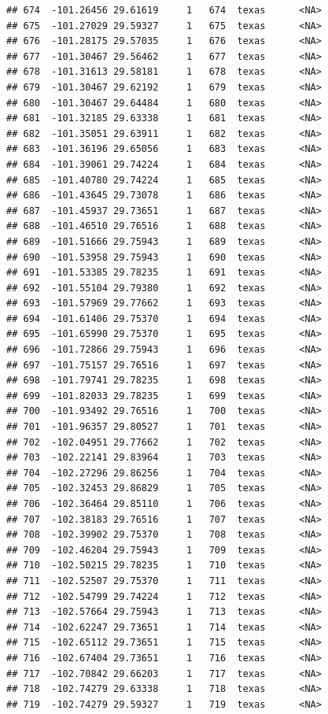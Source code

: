 \documentclass[
]{article}
\begin{document}
\begin{verbatim}
## 674  -101.26456 29.61619     1   674  texas      <NA>
## 675  -101.27029 29.59327     1   675  texas      <NA>
## 676  -101.28175 29.57035     1   676  texas      <NA>
## 677  -101.30467 29.56462     1   677  texas      <NA>
## 678  -101.31613 29.58181     1   678  texas      <NA>
## 679  -101.30467 29.62192     1   679  texas      <NA>
## 680  -101.30467 29.64484     1   680  texas      <NA>
## 681  -101.32185 29.63338     1   681  texas      <NA>
## 682  -101.35051 29.63911     1   682  texas      <NA>
## 683  -101.36196 29.65056     1   683  texas      <NA>
## 684  -101.39061 29.74224     1   684  texas      <NA>
## 685  -101.40780 29.74224     1   685  texas      <NA>
## 686  -101.43645 29.73078     1   686  texas      <NA>
## 687  -101.45937 29.73651     1   687  texas      <NA>
## 688  -101.46510 29.76516     1   688  texas      <NA>
## 689  -101.51666 29.75943     1   689  texas      <NA>
## 690  -101.53958 29.75943     1   690  texas      <NA>
## 691  -101.53385 29.78235     1   691  texas      <NA>
## 692  -101.55104 29.79380     1   692  texas      <NA>
## 693  -101.57969 29.77662     1   693  texas      <NA>
## 694  -101.61406 29.75370     1   694  texas      <NA>
## 695  -101.65990 29.75370     1   695  texas      <NA>
## 696  -101.72866 29.75943     1   696  texas      <NA>
## 697  -101.75157 29.76516     1   697  texas      <NA>
## 698  -101.79741 29.78235     1   698  texas      <NA>
## 699  -101.82033 29.78235     1   699  texas      <NA>
## 700  -101.93492 29.76516     1   700  texas      <NA>
## 701  -101.96357 29.80527     1   701  texas      <NA>
## 702  -102.04951 29.77662     1   702  texas      <NA>
## 703  -102.22141 29.83964     1   703  texas      <NA>
## 704  -102.27296 29.86256     1   704  texas      <NA>
## 705  -102.32453 29.86829     1   705  texas      <NA>
## 706  -102.36464 29.85110     1   706  texas      <NA>
## 707  -102.38183 29.76516     1   707  texas      <NA>
## 708  -102.39902 29.75370     1   708  texas      <NA>
## 709  -102.46204 29.75943     1   709  texas      <NA>
## 710  -102.50215 29.78235     1   710  texas      <NA>
## 711  -102.52507 29.75370     1   711  texas      <NA>
## 712  -102.54799 29.74224     1   712  texas      <NA>
## 713  -102.57664 29.75943     1   713  texas      <NA>
## 714  -102.62247 29.73651     1   714  texas      <NA>
## 715  -102.65112 29.73651     1   715  texas      <NA>
## 716  -102.67404 29.73651     1   716  texas      <NA>
## 717  -102.70842 29.66203     1   717  texas      <NA>
## 718  -102.74279 29.63338     1   718  texas      <NA>
## 719  -102.74279 29.59327     1   719  texas      <NA>

\end{verbatim}
\end{document}
